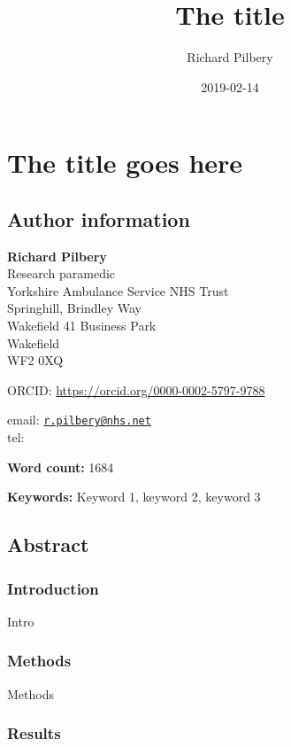 \documentclass[]{article}
\title{The title}
\author{Richard Pilbery}
\date{2019-02-14}
\begin{document}
\maketitle

\hypertarget{the-title-goes-here}{%
\section{The title goes here}\label{the-title-goes-here}}

\hypertarget{author-information}{%
\subsection{Author information}\label{author-information}}

\textbf{Richard Pilbery}\\
Research paramedic\\
Yorkshire Ambulance Service NHS Trust\\
Springhill, Brindley Way\\
Wakefield 41 Business Park\\
Wakefield\\
WF2 0XQ

ORCID: \url{https://orcid.org/0000-0002-5797-9788}

email: \href{mailto:r.pilbery@nhs.net}{\nolinkurl{r.pilbery@nhs.net}}\\
tel:

\textbf{Word count:} 1684

\textbf{Keywords:} Keyword 1, keyword 2, keyword 3

\hypertarget{abstract}{%
\subsection{Abstract}\label{abstract}}

\hypertarget{introduction}{%
\subsubsection{Introduction}\label{introduction}}

Intro

\hypertarget{methods}{%
\subsubsection{Methods}\label{methods}}

Methods

\hypertarget{results}{%
\subsubsection{Results}\label{results}}
\end{document}

